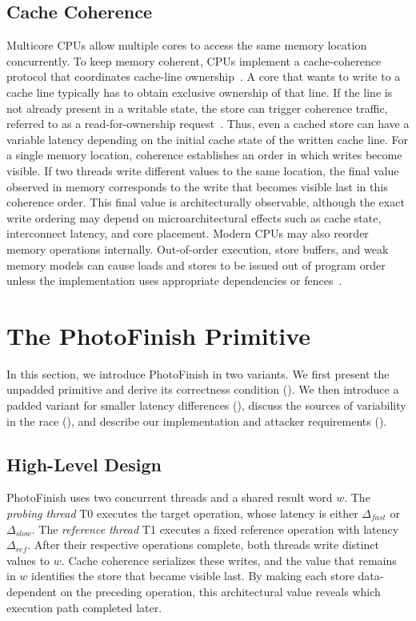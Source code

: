 \documentclass[letterpaper,twocolumn,10pt]{article} %
\newcommand{\AttackName}{PhotoFinish\xspace}
\newcommand{\tprobe}{{\fontfamily{cmtt}\selectfont T0}\xspace}
\newcommand{\tref}{{\fontfamily{cmtt}\selectfont T1}\xspace}
\begin{document}
\subsection{Cache Coherence}\label{sec:background:coherence}

Multicore CPUs allow multiple cores to access the same memory location concurrently.
To keep memory coherent, CPUs implement a cache-coherence protocol that coordinates cache-line ownership~\cite{papamarcos1984low,hum2005forward,AMD64_vol2}.
A core that wants to write to a cache line typically has to obtain exclusive ownership of that line.
If the line is not already present in a writable state, the store can trigger coherence traffic, referred to as a read-for-ownership request~\cite{Intel_combined}.
Thus, even a cached store can have a variable latency depending on the initial cache state of the written cache line.
For a single memory location, coherence establishes an order in which writes become visible.
If two threads write different values to the same location, the final value observed in memory corresponds to the write that becomes visible last in this coherence order.
This final value is architecturally observable, although the exact write ordering may depend on microarchitectural effects such as cache state, interconnect latency, and core placement.
Modern CPUs may also reorder memory operations internally.
Out-of-order execution, store buffers, and weak memory models can cause loads and stores to be issued out of program order unless the implementation uses appropriate dependencies or fences~\cite{Sorin2011}.

\section{The \AttackName Primitive}\label{sec:primitive}



In this section, we introduce \AttackName in two variants.
We first present the unpadded primitive and derive its correctness condition ().
We then introduce a padded variant for smaller latency differences (), discuss the sources of variability in the race (), and describe our implementation and attacker requirements ().

\subsection{High-Level Design}\label{subsec:primitive-overview}
\AttackName uses two concurrent threads and a shared result word $w$.
The \emph{probing thread} \tprobe executes the target operation, whose latency is either $\Delta_{fast}$ or $\Delta_{slow}$.
The \emph{reference thread} \tref executes a fixed reference operation with latency $\Delta_{ref}$.
After their respective operations complete, both threads write distinct values to $w$.
Cache coherence serializes these writes, and the value that remains in $w$ identifies the store that became visible last.
By making each store data-dependent on the preceding operation, this architectural value reveals which execution path completed later.
\end{document}
